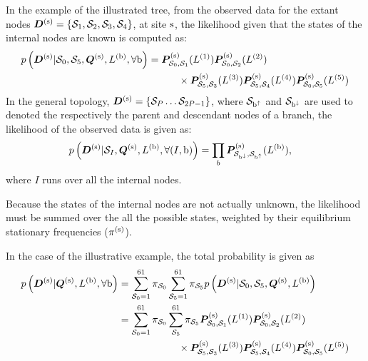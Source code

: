 In the example of the illustrated tree, from the observed data for the extant nodes $\bm{D}^{(\text{s})} = \{ \mathcal{S}_1,\mathcal{S}_2, \mathcal{S}_3, \mathcal{S}_4 \}$, at site $\text{s}$, the likelihood given that the states of the internal nodes are known is computed as:
\begin{align}
	p\left(\bm{D}^{(\text{s})}| \mathcal{S}_0, \mathcal{S}_5, \bm{Q}^{(\text{s})}, L^{(\text{b})}, \forall \text{b} \right) & = \bm{P}^{(\text{s})}_{\mathcal{S}_0, \mathcal{S}_1}(L^{(1)})
	\bm{P}^{(\text{s})}_{\mathcal{S}_0, \mathcal{S}_2}(L^{(2)}) \\
	& \quad \quad \quad
	\times \bm{P}^{(\text{s})}_{\mathcal{S}_5, \mathcal{S}_3}(L^{(3)})
	\bm{P}^{(\text{s})}_{\mathcal{S}_5, \mathcal{S}_4}(L^{(4)})
	\bm{P}^{(\text{s})}_{\mathcal{S}_0, \mathcal{S}_5}(L^{(5)}) \notag
\end{align}
In the general topology, $\bm{D}^{(\text{s})} = \{ \mathcal{S}_P \hdots \mathcal{S}_{2P-1} \}$, where $\mathcal{S}_{\text{b}^{\uparrow}}$ and $\mathcal{S}_{\text{b}^{\downarrow}}$ are used to denoted the respectively the parent and descendant nodes of a branch, the likelihood of the observed data is given as:
\begin{align}
p\left(\bm{D}^{(\text{s})}| \mathcal{S}_{I}, \bm{Q}^{(\text{s})}, L^{(\text{b})}, \forall (I, \text{b}) \right) & = \prod_{b} \bm{P}^{(\text{s})}_{\mathcal{S}_{\text{b}^{\downarrow}}, \mathcal{S}_{\text{b}^{\uparrow}}}(L^{(\text{b})}),
\end{align}
where $I$ runs over all the internal nodes.

Because the states of the internal nodes are not actually unknown, the likelihood must be summed over the all the possible states, weighted by their equilibrium stationary frequencies ($\pi^{(\text{s})}$).

In the case of the illustrative example, the total probability is given as
\begin{align}
	p\left(\bm{D}^{(\text{s})}| \bm{Q}^{(\text{s})}, L^{(\text{b})} , \forall \text{b} \right) & = \sum_{\mathcal{S}_0=1}^{61} \pi_{\mathcal{S}_0} \sum_{\mathcal{S}_5=1}^{61} \pi_{\mathcal{S}_5} p\left(\bm{D}^{(\text{s})}| \mathcal{S}_0, \mathcal{S}_5, \bm{Q}^{(\text{s})}, L^{(\text{b})} \right) \\
	& = \sum_{\mathcal{S}_0=1}^{61} \pi_{\mathcal{S}_0} \sum_{\mathcal{S}_5}^{61} \pi_{\mathcal{S}_5} \bm{P}^{(\text{s})}_{\mathcal{S}_0, \mathcal{S}_1}(L^{(1)})
	\bm{P}^{(\text{s})}_{\mathcal{S}_0, \mathcal{S}_2}(L^{(2)}) \\
	& \qquad \qquad \qquad
	\times \bm{P}^{(\text{s})}_{\mathcal{S}_5, \mathcal{S}_3}(L^{(3)})
	\bm{P}^{(\text{s})}_{\mathcal{S}_5, \mathcal{S}_4}(L^{(4)})
	\bm{P}^{(\text{s})}_{\mathcal{S}_0, \mathcal{S}_5}(L^{(5)})\notag
\end{align}

